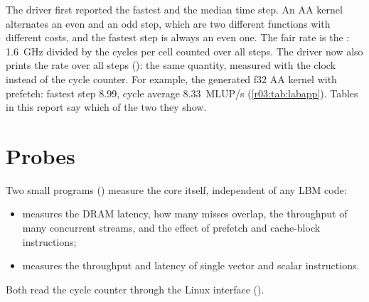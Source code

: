 \begin{pitfall}
The driver first reported the fastest and the median time step. An AA kernel alternates an
even and an odd step, which are two different functions with different costs, and the
fastest step is always an even one. The fair rate is the : 1.6~GHz divided
by the cycles per cell counted over all steps. The driver now also prints the rate over all
steps (): the same quantity, measured with the clock instead of the cycle
counter.
For example, the generated f32 AA kernel with prefetch: fastest step 8.99, cycle average
8.33~MLUP/s (\cref{r03:tab:labapp}). Tables in this report say which of the two they show.
\end{pitfall}

\section{Probes}\label{r03:sec:probes}

Two small programs () measure the core itself, independent of any
LBM code:
\begin{itemize}
  \item {} measures the DRAM latency, how many misses
        overlap, the throughput of many concurrent streams, and the effect of prefetch and
        cache-block instructions;
  \item {} measures the throughput and latency of single
        vector and scalar instructions.
\end{itemize}
Both read the cycle counter through the Linux interface 
().
